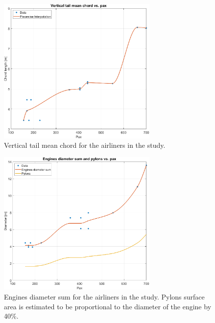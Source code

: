 \documentclass[english]{kththesis}
\begin{document}
\begin{figure}[!ht]
    \centering
    \includegraphics[width=0.7\textwidth]{Epictures/VtailChordVSPax.png}
    \caption{Vertical tail mean chord for the airliners in the study.}
    \label{fig:VtailChordPax}
\end{figure}

\begin{figure}[!ht]
    \centering
    \includegraphics[width=0.7\textwidth]{Epictures/EnginesDiaSumVSPax.png}
    \caption{Engines diameter sum for the airliners in the study. Pylons surface area is estimated to be proportional to the diameter of the engine by 40\%. }
    \label{fig:EngDiaSumPax}
\end{figure}
\end{document}
